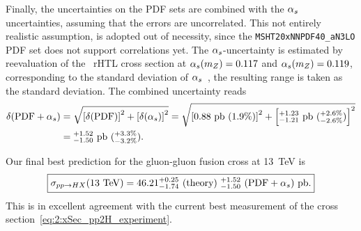 Finally, the uncertainties on the \acs{PDF} sets are combined with the $\alpha_s$ uncertainties, assuming that the errors are uncorrelated. This not entirely realistic assumption, is adopted out of necessity, since the \texttt{MSHT20xNNPDF40\_aN3LO} \acs{PDF} set does not support correlations yet. The $\alpha_s$-uncertainty is estimated by reevaluation of the \NNNLO\ \acs{rHTL} cross section at $\alpha_s (m_Z) = 0.117$ and $\alpha_s (m_Z) = 0.119$, corresponding to the standard deviation of $\alpha_s$~\cite{ParticleDataGroup:2022pth}, the resulting range is taken as the standard deviation. The combined uncertainty reads
\begin{equation}
\begin{split}
\delta (\text{PDF} + \alpha_s) &= \sqrt{\left[\delta (\text{PDF}) \right]^2 + \left[\delta (\alpha_s)\right]^2} = \sqrt{\left[0.88\ \text{pb}\ (1.9\%) \right]^2 + \left[{}^{+1.23}_{-1.21} \ \text{pb}\ ({}^{+2.6\%}_{-2.6\%}) \right]^2} \\
&= {}^{+1.52}_{-1.50}\ \text{pb} \ ({}^{+3.3\%}_{-3.2\%}).
\end{split}
\end{equation}

Our final best prediction for the gluon-gluon fusion cross at 13~TeV is
\begin{equation}
\boxed{\sigma_{pp \rightarrow HX} (13 \ \mathrm{TeV}) =  46.21^{+0.25}_{-1.74}\ (\text{theory})\ {}^{+1.52}_{-1.50}\ (\text{PDF} + \alpha_s) \ \text{pb}. }
\end{equation}
This is in excellent agreement with the current best measurement of the cross section~\eqref{eq:2:xSec_pp2H_experiment}.



